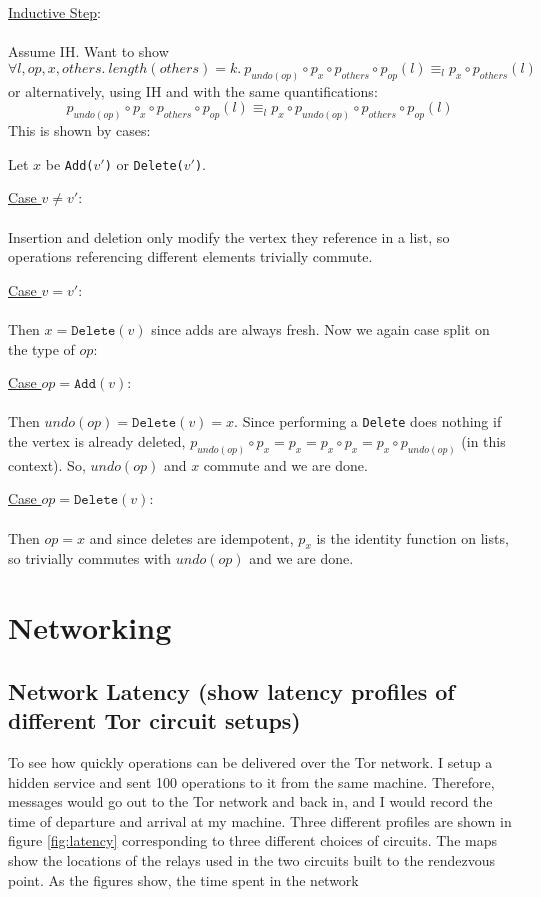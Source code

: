 \documentclass[diss.tex]{subfiles}
\begin{document}
\noindent\underline{Inductive Step}:\\\\
Assume IH. 
Want to show $$ \forall l, op, x, others.~ length(others)=k. ~ p_{undo(op)} \circ p_x \circ p_{others} \circ p_{op}(l)  \equiv_l p_x \circ p_{others}(l) $$
%
%
\noindent or alternatively, using IH and with the same quantifications: 
$$ p_{undo(op)} \circ p_x \circ p_{others} \circ p_{op}(l)  \equiv_l  p_x \circ p_{undo(op)}\circ p_{others} \circ p_{op}(l) $$
\noindent This is shown by cases:

\setlength{\leftskip}{1cm}
\noindent Let $x$ be \texttt{Add{($v'$)}} or \texttt{Delete{($v'$)}}.

\noindent\underline{Case $v\not=v'$}:\\\\
Insertion and deletion only modify the vertex they reference in a list, so operations referencing different elements trivially commute.

\noindent\underline{Case $v=v'$}:\\\\
Then $x = \texttt{Delete}(v)$ since adds are always fresh. Now we again case split on the type of $op$:

\setlength{\leftskip}{2cm}

\noindent\underline{Case $op = \texttt{Add}(v)$}:\\\\
Then $undo(op) = \texttt{Delete}(v) = x$. Since performing a \texttt{Delete} does nothing if the vertex is already deleted, $p_{undo(op)} \circ p_x = p_x = p_x \circ p_x = p_x \circ p_{undo(op)}$ (in this context). So, $undo(op)$ and $x$ commute and we are done. 

\noindent\underline{Case $op = \texttt{Delete}(v)$}:\\\\
Then $op = x$ and since deletes are idempotent, $p_x$ is the identity function on lists, so trivially commutes with $undo(op)$ and we are done.

\setlength{\leftskip}{0cm}

\section{Networking}
\subsection{Network Latency (show latency profiles of different Tor circuit setups)}
To see how quickly operations can be delivered over the Tor network. I setup a hidden service and sent 100 operations to it from the same machine. Therefore, messages would go out to the Tor network and back in, and I would record the time of departure and arrival at my machine. Three different profiles are shown in figure \ref{fig:latency} corresponding to three different choices of circuits. The maps show the locations of the relays used in the two circuits built to the rendezvous point. As the figures show, the time spent in the network 
\end{document}
